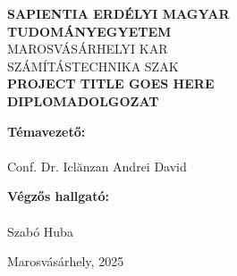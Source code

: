 \begin{titlepage}
    \centering
    \vspace*{2cm}

    {\Large \textbf{SAPIENTIA ERDÉLYI MAGYAR}}\\[0.2cm]
    {\Large \textbf{TUDOMÁNYEGYETEM}}\\[0.5cm]
    {\large MAROSVÁSÁRHELYI KAR}\\[0.2cm]
    {\large SZÁMÍTÁSTECHNIKA SZAK}\\[3cm]

    {\LARGE \textbf{PROJECT TITLE GOES HERE}}\\[0.5cm] 
    {\Large \textbf{DIPLOMADOLGOZAT}}\\[4cm]

    \begin{flushleft}
        \begin{minipage}{0.45\textwidth}
            \textbf{Témavezető:}\\
            \\
            Conf. Dr. Iclănzan Andrei David\\
        \end{minipage}
        \hfill
        \begin{minipage}{0.45\textwidth}
            \textbf{Végzős hallgató:}\\
            \\
            Szabó Huba
        \end{minipage}
    \end{flushleft}

    \vfill

    {\large Marosvásárhely, 2025}

\end{titlepage}
